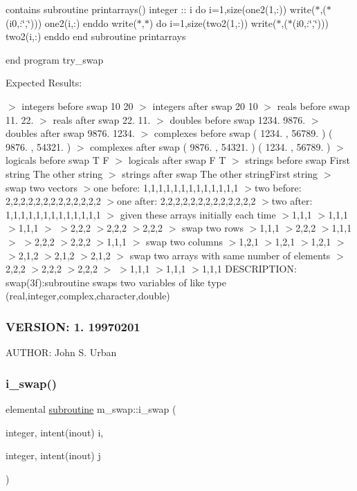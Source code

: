 contains subroutine printarrays() integer \+:\+: i do i=1,size(one2(1,\+:)) write($\ast$,\textquotesingle{}($\ast$(i0,\+:\char`\"{},\char`\"{}))\textquotesingle{}) one2(i,\+:) enddo write($\ast$,$\ast$) do i=1,size(two2(1,\+:)) write($\ast$,\textquotesingle{}($\ast$(i0,\+:\char`\"{},\char`\"{}))\textquotesingle{}) two2(i,\+:) enddo end subroutine printarrays

end program try\+\_\+swap

Expected Results\+:

$>$ integers before swap 10 20 $>$ integers after swap 20 10 $>$ reals before swap 11. 22. $>$ reals after swap 22. 11. $>$ doubles before swap 1234. 9876. $>$ doubles after swap 9876. 1234. $>$ complexes before swap ( 1234. , 56789. ) ( 9876. , 54321. ) $>$ complexes after swap ( 9876. , 54321. ) ( 1234. , 56789. ) $>$ logicals before swap T F $>$ logicals after swap F T $>$ strings before swap First string The other string $>$ strings after swap The other string\+First string $>$ swap two vectors $>$one before\+: 1,1,1,1,1,1,1,1,1,1,1,1,1 $>$two before\+: 2,2,2,2,2,2,2,2,2,2,2,2,2 $>$one after\+: 2,2,2,2,2,2,2,2,2,2,2,2,2 $>$two after\+: 1,1,1,1,1,1,1,1,1,1,1,1,1 $>$ given these arrays initially each time $>$1,1,1 $>$1,1,1 $>$1,1,1 $>$ $>$2,2,2 $>$2,2,2 $>$2,2,2 $>$ swap two rows $>$1,1,1 $>$2,2,2 $>$1,1,1 $>$ $>$2,2,2 $>$2,2,2 $>$1,1,1 $>$ swap two columns $>$1,2,1 $>$1,2,1 $>$1,2,1 $>$ $>$2,1,2 $>$2,1,2 $>$2,1,2 $>$ swap two arrays with same number of elements $>$2,2,2 $>$2,2,2 $>$2,2,2 $>$ $>$1,1,1 $>$1,1,1 $>$1,1,1 D\+E\+S\+C\+R\+I\+P\+T\+I\+ON\+: swap(3f)\+:subroutine swaps two variables of like type (real,integer,complex,character,double) \subsubsection*{V\+E\+R\+S\+I\+ON\+: 1. 19970201}

A\+U\+T\+H\+OR\+: John S. Urban \mbox{\label{namespacem__swap_ac8e4f4c4892b543c110823934032791f}} 
\subsubsection{\texorpdfstring{i\+\_\+swap()}{i\_swap()}}
{\footnotesize\ttfamily elemental \hyperlink{M__stopwatch_83_8txt_acfbcff50169d691ff02d4a123ed70482}{subroutine} m\+\_\+swap\+::i\+\_\+swap (\begin{DoxyParamCaption}\item[{integer, intent(inout)}]{i,  }\item[{integer, intent(inout)}]{j }\end{DoxyParamCaption})\hspace{0.3cm}{\ttfamily [private]}}

